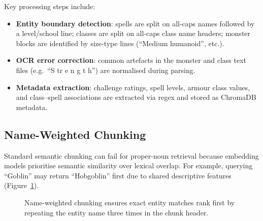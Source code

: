 \documentclass[12pt,a4paper]{article}
\begin{document}
Key processing steps include:
\begin{itemize}[noitemsep]
    \item \textbf{Entity boundary detection}: spells are split on all-caps
          names followed by a level/school line; classes are split on
          all-caps class name headers; monster blocks are identified by
          size-type lines (``Medium humanoid'', etc.).
    \item \textbf{OCR error correction}: common artefacts in the monster and
          class text files (e.g.\ ``S tr e n g t h'') are normalised during
          parsing.
    \item \textbf{Metadata extraction}: challenge ratings, spell levels,
          armour class values, and class--spell associations are extracted via
          regex and stored as ChromaDB metadata.
\end{itemize}

\subsection{Name-Weighted Chunking}
\label{sec:nameweighting}

Standard semantic chunking can fail for proper-noun retrieval because
embedding models prioritise semantic similarity over lexical overlap. For
example, querying ``Goblin'' may return ``Hobgoblin'' first due to shared
descriptive features (Figure~\ref{fig:nameweight}).

\begin{figure}[H]
\centering
{}
\caption{Name-weighted chunking ensures exact entity matches rank first
by repeating the entity name three times in the chunk header.}
\label{fig:nameweight}
\end{figure}
\end{document}
